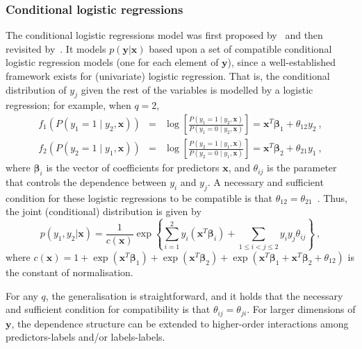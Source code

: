 \documentclass[review]{elsarticle}
\begin{document}
	\subsubsection{Conditional logistic regressions}
	
	The conditional logistic regressions model was first proposed by~\citet{JOE} and then revisited by~\citet{MVB}. It models $p(\mathbf{y}|\mathbf{x})$ based upon a set of compatible conditional logistic regression models (one for each element of $\mathbf{y}$), since a well-established framework exists for (univariate) logistic regression. That is, the conditional distribution of $y_{j}$ given the rest of the variables is modelled by a logistic regression; for example, when $q=2$,
	\begin{eqnarray*}
		f_1 \left( P(y_{1} = 1 \mid y_{2},\mathbf{x}) \right) &=& \log \left[ \frac{P(y_{1} = 1\mid y_{2},\mathbf{x})}{P(y_{1} = 0\mid y_{2},\mathbf{x})} \right] = \mathbf{x}^T\bm{\beta} _{1} + \theta_{12}y_{2}\ , \\
		f_2 \left( P(y_{2} = 1 \mid y_{1},\mathbf{x}) \right) &=& \log \left[ \frac{P(y_{2} = 1\mid y_{1},\mathbf{x})}{P(y_{2} = 0\mid y_{1},\mathbf{x})} \right] = \mathbf{x}^T\bm{\beta} _{2} + \theta_{21}y_{1}\ ,
	\end{eqnarray*}
	where $\bm{\beta}_{i}$ is the vector of coefficients for predictors $\mathbf{x}$, and $\theta_{ij}$ is the parameter that controls the dependence between $y_{i}$ and $y_{j}$. A necessary and sufficient condition for these logistic regressions to be compatible is that $\theta_{12} = \theta_{21}$~\citep{JOE}. Thus, the joint (conditional) distribution is given by
	\begin{equation} \label{JC}
	p(y_{1},y_{2}|\mathbf{x}) = \frac{1}{c(\mathbf{x})} \exp \left \{ \sum^{2}_{i=1}{y_{i} \left( \mathbf{x}^T \bm{\beta}_{i} \right)} + \sum_{1 \leq i < j \leq 2}{y_{i}y_{j}\theta_{ij}} \right\}\ ,
	\end{equation}
	where $c(\mathbf{x}) = 1 + \exp(\mathbf{x}^T\bm{\beta}_{1}) + \exp(\mathbf{x}^T\bm{\beta}_{2}) + \exp(\mathbf{x}^T\bm{\beta}_{1}+\mathbf{x}^T\bm{\beta}_{2} + \theta_{12})$ is the constant of normalisation.
	
	For any $q$, the generalisation is straightforward, and it holds that the necessary and sufficient condition for compatibility is that $\theta_{ij} = \theta_{ji}$. For larger dimensions of $\mathbf{y}$, the dependence structure can be extended to higher-order interactions among predictors-labels and/or labels-labels.
	
\end{document}
